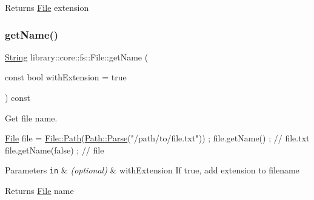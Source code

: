 \begin{DoxyReturn}{Returns}
\hyperlink{classlibrary_1_1core_1_1fs_1_1_file}{File} extension 
\end{DoxyReturn}
\mbox{\label{classlibrary_1_1core_1_1fs_1_1_file_a118f4405fec3786d22937e6a77a0cecc}} 
\subsubsection{\texorpdfstring{get\+Name()}{getName()}}
{\footnotesize\ttfamily \hyperlink{classlibrary_1_1core_1_1types_1_1_string}{String} library\+::core\+::fs\+::\+File\+::get\+Name (\begin{DoxyParamCaption}\item[{const bool}]{with\+Extension = {\ttfamily true} }\end{DoxyParamCaption}) const}



Get file name. 


\begin{DoxyCode}
\hyperlink{classlibrary_1_1core_1_1fs_1_1_file_a6f3f0d79545ac9984c6f49432f0c6c39}{File} file = \hyperlink{classlibrary_1_1core_1_1fs_1_1_file_a72d6cdf8bb7e299889c6149e2b8a6cc7}{File::Path}(\hyperlink{classlibrary_1_1core_1_1fs_1_1_path_a6ba644b6609507e724c217bf2020f5ae}{Path::Parse}(\textcolor{stringliteral}{"/path/to/file.txt"})) ;
file.getName() ; \textcolor{comment}{// file.txt}
file.getName(\textcolor{keyword}{false}) ; \textcolor{comment}{// file}
\end{DoxyCode}



\begin{DoxyParams}[1]{Parameters}
\mbox{\tt in}  & {\em (optional)} & with\+Extension If true, add extension to filename \\
\hline
\end{DoxyParams}
\begin{DoxyReturn}{Returns}
\hyperlink{classlibrary_1_1core_1_1fs_1_1_file}{File} name 
\end{DoxyReturn}
\mbox{\label{classlibrary_1_1core_1_1fs_1_1_file_a8eb74097f9bdc9d3c626fe4924bf405e}} 
